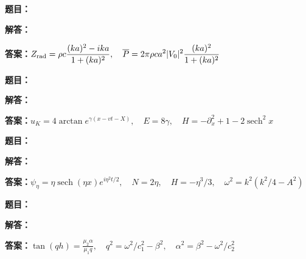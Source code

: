 \documentclass[lang=cn,color=blue,11pt]{elegantbook}
\begin{document}
\par
\noindent\textbf{题目：}
\par\noindent\textbf{解答：}
\par\noindent\textbf{答案：}\(\displaystyle Z_{\rm rad}=\rho c\frac{(ka)^2-i ka}{1+(ka)^2},\quad \overline P=2\pi\rho c a^2|V_0|^2\frac{(ka)^2}{1+(ka)^2}\)\par
\par\smallskip\noindent\hrulefill\par\medskip
{}\par
\noindent\textbf{题目：}
\par\noindent\textbf{解答：}
\par\noindent\textbf{答案：}\(\displaystyle u_K=4\arctan e^{\gamma(x-vt-X)},\quad E=8\gamma,\quad H=-\partial_x^2+1-2\operatorname{sech}^2x\)\par
\par\smallskip\noindent\hrulefill\par\medskip
{}\par
\noindent\textbf{题目：}
\par\noindent\textbf{解答：}
\par\noindent\textbf{答案：}\(\displaystyle \psi_\eta=\eta\operatorname{sech}(\eta x)e^{i\eta^2t/2},\quad N=2\eta,\quad H=-\eta^3/3,\quad \omega^2=k^2(k^2/4-A^2)\)\par
\par\smallskip\noindent\hrulefill\par\medskip
{}\par
\noindent\textbf{题目：}
\par\noindent\textbf{解答：}
\par\noindent\textbf{答案：}\(\displaystyle \tan(qh)=\frac{\mu_2\alpha}{\mu_1q},\quad q^2=\omega^2/c_1^2-\beta^2,\quad\alpha^2=\beta^2-\omega^2/c_2^2\)\par
\end{document}
